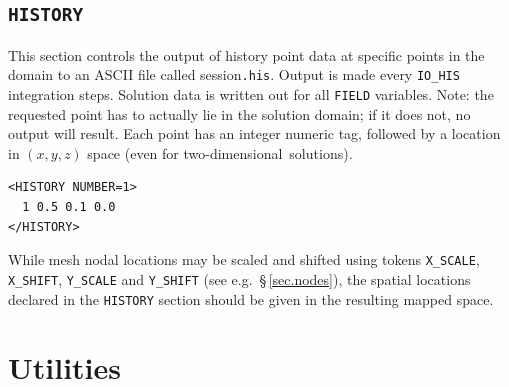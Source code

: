 \documentclass[11pt]{report}
\newcommand\twod{two-di\-men\-sion\-al}
\newcommand{\eg}{e.g.\ } \newcommand{\CC}{\mathrm{c.c.}}
\begin{document}
\subsection{\texttt{HISTORY}}
\label{sec.historyy}

This section controls the output of history point data at specific
points in the domain to an ASCII file called session\verb|.his|.
Output is made every \verb|IO_HIS| integration steps.  Solution data
is written out for all \verb|FIELD| variables.  Note: the requested
point has to actually lie in the solution domain; if it does not, no
output will result. Each point has an integer numeric tag, followed by
a location in $(x,y,z)$ space (even for \twod\ solutions).
%
{\small
\begin{verbatim}
<HISTORY NUMBER=1>
  1	0.5	0.1	0.0
</HISTORY>
\end{verbatim}
}
%
While mesh nodal locations may be scaled and shifted using tokens
\verb|X_SCALE|, \verb|X_SHIFT|, \verb|Y_SCALE| and \verb|Y_SHIFT| (see
\eg \S\,\ref{sec.nodes}), the spatial locations declared in the
\verb|HISTORY| section should be given in the resulting mapped space.

\section{Utilities}
\end{document}
